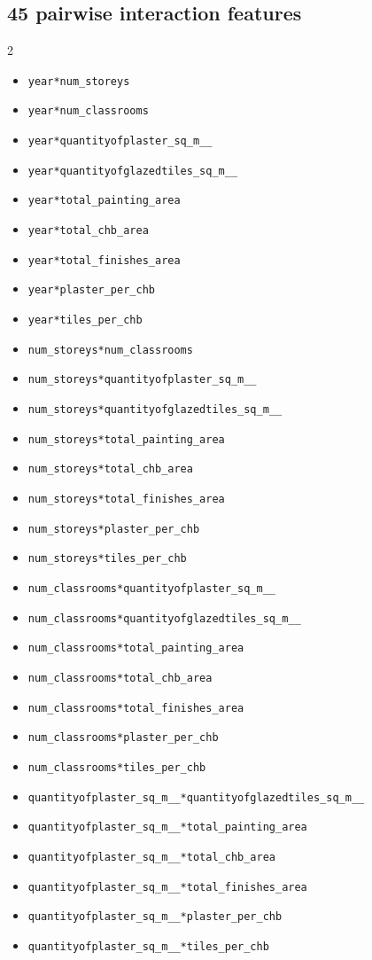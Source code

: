 \documentclass[11pt]{article}
\begin{document}
\subsection*{45 pairwise interaction features}
\footnotesize
\begin{multicols}{2}
\begin{itemize}[leftmargin=*]
  \item \verb|year*num_storeys|\item \verb|year*num_classrooms|\item \verb|year*quantityofplaster_sq_m__|\item \verb|year*quantityofglazedtiles_sq_m__|\item \verb|year*total_painting_area|\item \verb|year*total_chb_area|\item \verb|year*total_finishes_area|\item \verb|year*plaster_per_chb|\item \verb|year*tiles_per_chb|
  \item \verb|num_storeys*num_classrooms|\item \verb|num_storeys*quantityofplaster_sq_m__|\item \verb|num_storeys*quantityofglazedtiles_sq_m__|\item \verb|num_storeys*total_painting_area|\item \verb|num_storeys*total_chb_area|\item \verb|num_storeys*total_finishes_area|\item \verb|num_storeys*plaster_per_chb|\item \verb|num_storeys*tiles_per_chb|
  \item \verb|num_classrooms*quantityofplaster_sq_m__|\item \verb|num_classrooms*quantityofglazedtiles_sq_m__|\item \verb|num_classrooms*total_painting_area|\item \verb|num_classrooms*total_chb_area|\item \verb|num_classrooms*total_finishes_area|\item \verb|num_classrooms*plaster_per_chb|\item \verb|num_classrooms*tiles_per_chb|
  \item \verb|quantityofplaster_sq_m__*quantityofglazedtiles_sq_m__|\item \verb|quantityofplaster_sq_m__*total_painting_area|\item \verb|quantityofplaster_sq_m__*total_chb_area|\item \verb|quantityofplaster_sq_m__*total_finishes_area|\item \verb|quantityofplaster_sq_m__*plaster_per_chb|\item \verb|quantityofplaster_sq_m__*tiles_per_chb|

\end{itemize}
\end{multicols}
\end{document}
